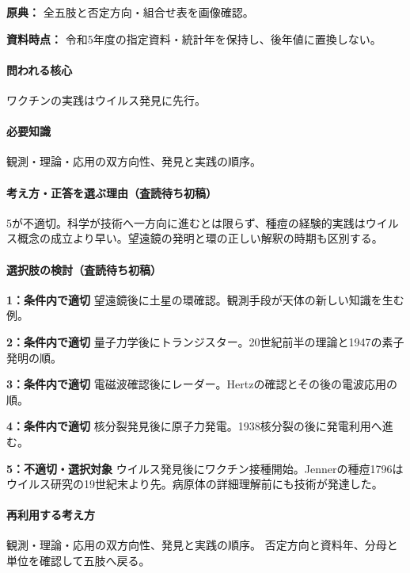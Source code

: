 \noindent\textbf{原典：} 全五肢と否定方向・組合せ表を画像確認。\par

\noindent\textbf{資料時点：} 令和5年度の指定資料・統計年を保持し、後年値に置換しない。\par

\paragraph{問われる核心} ワクチンの実践はウイルス発見に先行。

\paragraph{必要知識} 観測・理論・応用の双方向性、発見と実践の順序。

\paragraph{考え方・正答を選ぶ理由（査読待ち初稿）} 5が不適切。科学が技術へ一方向に進むとは限らず、種痘の経験的実践はウイルス概念の成立より早い。望遠鏡の発明と環の正しい解釈の時期も区別する。

\paragraph{選択肢の検討（査読待ち初稿）}\mbox{}\par

\noindent\textbf{1：条件内で適切} 望遠鏡後に土星の環確認。観測手段が天体の新しい知識を生む例。\par

\noindent\textbf{2：条件内で適切} 量子力学後にトランジスター。20世紀前半の理論と1947の素子発明の順。\par

\noindent\textbf{3：条件内で適切} 電磁波確認後にレーダー。Hertzの確認とその後の電波応用の順。\par

\noindent\textbf{4：条件内で適切} 核分裂発見後に原子力発電。1938核分裂の後に発電利用へ進む。\par

\noindent\textbf{5：不適切・選択対象} ウイルス発見後にワクチン接種開始。Jennerの種痘1796はウイルス研究の19世紀末より先。病原体の詳細理解前にも技術が発達した。\par

\paragraph{再利用する考え方} 観測・理論・応用の双方向性、発見と実践の順序。 否定方向と資料年、分母と単位を確認して五肢へ戻る。

